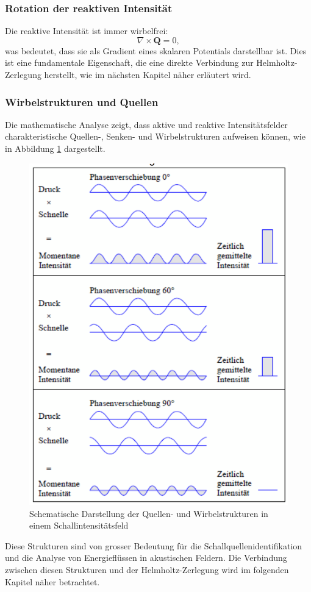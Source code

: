 \subsubsection{Rotation der reaktiven Intensität}

Die reaktive Intensität ist immer wirbelfrei:
\begin{equation}
\nabla \times \boldsymbol{Q} = 0,
\end{equation}
was bedeutet, dass sie als Gradient eines skalaren Potentials darstellbar ist.
Dies ist eine fundamentale Eigenschaft, die eine direkte Verbindung zur Helmholtz-Zerlegung herstellt, wie im nächsten Kapitel näher erläutert wird.

\subsubsection{Wirbelstrukturen und Quellen}

Die mathematische Analyse zeigt, dass aktive und reaktive Intensitätsfelder charakteristische Quellen-, Senken- und Wirbelstrukturen aufweisen können, wie in Abbildung \ref{fig:Schallintensitaet} dargestellt.

\begin{figure}
\centering
\includegraphics[scale=0.4]{papers/helmholtz/images/Schallintensitaet.png}
\caption{Schematische Darstellung der Quellen- und Wirbelstrukturen in einem Schallintensitätsfeld}
\label{fig:Schallintensitaet}
\end{figure}

Diese Strukturen sind von grosser Bedeutung für die Schallquellenidentifikation und die Analyse von Energieflüssen in akustischen Feldern.
Die Verbindung zwischen diesen Strukturen und der Helmholtz-Zerlegung wird im folgenden Kapitel näher betrachtet.




